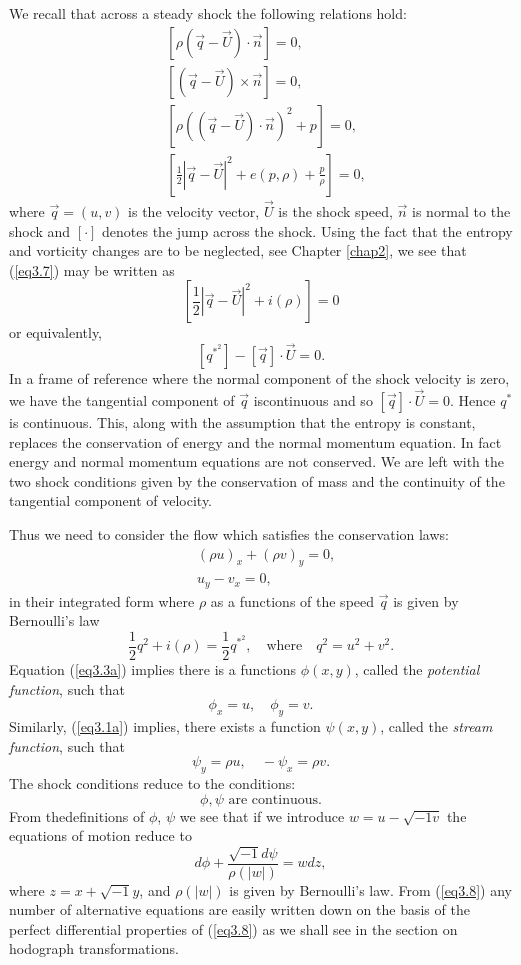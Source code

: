 We recall that across a steady shock the following relations hold:
\begin{align*}
& [\rho (\vec{q} - \vec{U}) \cdot \vec{n}] = 0, \tag{3.4}\label{eq3.4}\\
& [(\vec{q} - \vec{U}) \times \vec{n}] = 0,\tag{3.5}\label{eq3.5}\\
& [\rho ((\vec{q} - \vec{U}) \cdot \vec{n})^2 + p] = 0,\tag{3.6}\label{eq3.6}\\
& [\frac{1}{2} |\vec{q} - \vec{U}|^2 + e(p,\rho) + \frac{p}{\rho} ] = 0,\tag{3.7}\label{eq3.7}
\end{align*}
where $\vec{q} = (u,v)$ is the velocity vector, $\vec{U}$ is the shock speed, $\vec{n}$ is normal to the shock and $[\cdot]$ denotes the jump across the shock. Using the fact that the entropy and vorticity changes are to be neglected, see Chapter \ref{chap2}, we see that (\ref{eq3.7}) may be written as 
$$
[\frac{1}{2} |\vec{q} - \vec{U}|^2 + i (\rho) ] = 0 
$$
or equivalently,
$$
[q^{*^2}] - [\vec{q}] \cdot \vec{U} = 0.
$$
In a frame of reference where the normal component of the shock velocity is zero, we have the tangential component of $\vec{q}$ is\pageoriginale continuous and so $[\vec{q}] \cdot \vec{U} = 0$. Hence $q^*$ is continuous. This, along with the assumption that the entropy is constant, replaces the conservation of energy and the normal momentum equation. In fact energy and normal momentum equations are not conserved. We are left with the two shock conditions given by the conservation of mass and the continuity of the tangential component of velocity.

Thus we need to consider the flow which satisfies the conservation laws:
\begin{align*}
& (\rho u)_x + (\rho v)_y =0, \tag{3.1a}\label{eq3.1a}\\
& u_y - v_x = 0, \tag{3.3a}\label{eq3.3a}
\end{align*}
in their integrated form where $\rho$ as a functions of the speed $\vec{q}$ is given by Bernoulli's law 
$$
\frac{1}{2} q^2 + i (\rho) = \frac{1}{2} q^{*^2} , \quad \text{where} \quad  q^2 = u^2 + v^2. 
$$
Equation (\ref{eq3.3a}) implies there is a functions $\phi (x,y)$, called the {\em potential function}, such that 
$$
\phi_x = u, \quad \phi_y = v.
$$
Similarly, (\ref{eq3.1a}) implies, there exists a function $\psi(x,y)$, called the {\em stream function}, such that 
$$
\psi_y = \rho u, \quad - \psi_x = \rho v.
$$
The shock conditions reduce to the conditions:
$$
\phi, \psi \text{ are continuous.}
$$
From the\pageoriginale definitions of $\phi$, $\psi$ we see that if we introduce $w = u - \sqrt{-1v}$ the equations of motion reduce to
\begin{equation*}
d \phi + \frac{\sqrt{-1} d\psi}{\rho(|w|)} = wdz, 
\tag{3.8}\label{eq3.8}
\end{equation*}
where $z = x + \sqrt{-1} y$, and $\rho (|w|)$ is given by Bernoulli's law. From (\ref{eq3.8}) any number of alternative equations are easily written down on the basis of the perfect differential properties of (\ref{eq3.8}) as we shall see in the section on hodograph transformations.

